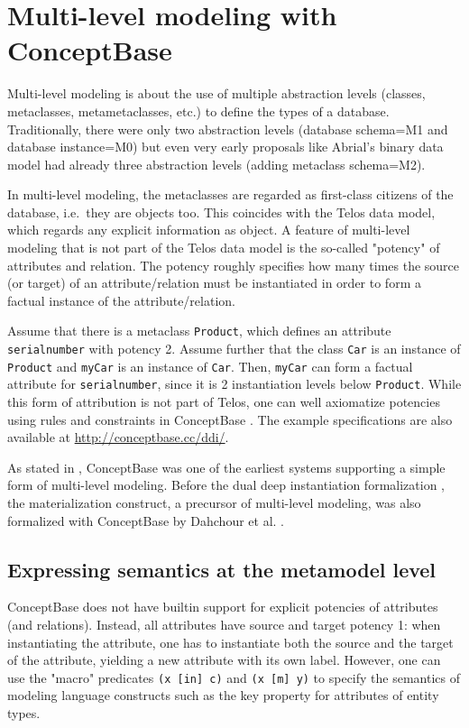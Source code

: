 \section{Multi-level modeling with ConceptBase} \label{sec:mlm}

Multi-level modeling is about the use of multiple abstraction levels
(classes, metaclasses, metametaclasses, etc.) to define the types
of a database. Traditionally, there were only two abstraction
levels (database schema=M1 and database instance=M0) but even very early proposals like Abrial's 
binary data model had already three abstraction levels (adding metaclass schema=M2).

In multi-level modeling, the metaclasses are regarded as first-class
citizens of the database, i.e.\ they are objects too. This coincides
with the Telos data model, which regards any explicit information as
object. A feature of multi-level modeling that is not part of the Telos
data model is the so-called "potency" of attributes and relation.
The potency roughly specifies how many times the source (or target)
of an attribute/relation must be instantiated in order to form a factual
instance of the attribute/relation.

Assume that there is a metaclass {\tt Product}, which defines an
attribute {\tt serialnumber} with potency 2. Assume further that the class
{\tt Car} is an instance of {\tt Product} and {\tt myCar} is an instance of 
{\tt Car}. Then, {\tt myCar} can form a factual attribute for {\tt serialnumber},
since it is 2 instantiation levels below {\tt Product}.
While this form of attribution is not part of Telos, one can well
axiomatize potencies using rules and constraints in ConceptBase \cite{DDI2014}.
The example specifications are also available at
\url{http://conceptbase.cc/ddi/}.

As stated in \cite{RLGW2014}, ConceptBase was one of the earliest systems 
supporting a simple form of multi-level modeling. Before the 
dual deep instantiation formalization \cite{DDI2014}, the materialization
construct, a precursor of multi-level modeling, was also formalized
with ConceptBase by Dahchour et al. \cite{DPZ2002}. 

\subsection{Expressing semantics at the metamodel level} \label{sec:semmm}

ConceptBase does not have builtin support for explicit potencies of attributes
(and relations). Instead, all attributes have source and target potency 1:
when instantiating the attribute, one has to instantiate both the source and the
target of the attribute, yielding a new attribute with its own label.
However, one can use the "macro" predicates {\tt (x [in] c)} and
{\tt (x [m] y)} to specify the semantics of modeling language constructs
such as the key property for attributes of entity types.


